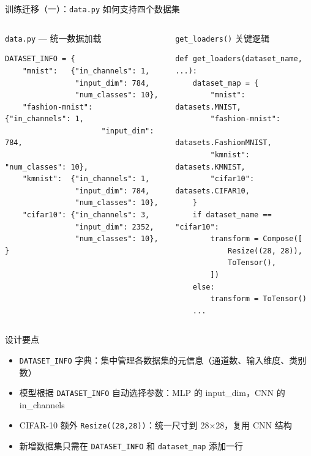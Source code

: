 \documentclass[aspectratio=169]{ctexbeamer}
\begin{document}
\begin{frame}[fragile,shrink=28]{训练迁移（一）：\texttt{data.py} 如何支持四个数据集}
\small

\begin{columns}[T]
\begin{block}{\texttt{data.py} — 统一数据加载}
\footnotesize
\begin{lstlisting}[basicstyle=\ttfamily\scriptsize, frame=none, numbers=none, backgroundcolor=\color{codebg}]
DATASET_INFO = {
    "mnist":   {"in_channels": 1,
                "input_dim": 784,
                "num_classes": 10},
    "fashion-mnist": {"in_channels": 1,
                      "input_dim": 784,
                      "num_classes": 10},
    "kmnist":  {"in_channels": 1,
                "input_dim": 784,
                "num_classes": 10},
    "cifar10": {"in_channels": 3,
                "input_dim": 2352,
                "num_classes": 10},
}
\end{lstlisting}
\end{block}

\begin{block}{\texttt{get\_loaders()} 关键逻辑}
\footnotesize
\begin{lstlisting}[basicstyle=\ttfamily\scriptsize, frame=none, numbers=none, backgroundcolor=\color{codebg}]
def get_loaders(dataset_name, ...):
    dataset_map = {
        "mnist": datasets.MNIST,
        "fashion-mnist":
            datasets.FashionMNIST,
        "kmnist": datasets.KMNIST,
        "cifar10": datasets.CIFAR10,
    }
    if dataset_name == "cifar10":
        transform = Compose([
            Resize((28, 28)),
            ToTensor(),
        ])
    else:
        transform = ToTensor()
    ...
\end{lstlisting}
\end{block}
\end{columns}

\vspace{0.1cm}

\begin{exampleblock}{设计要点}
\footnotesize
\begin{itemize}
  \item \texttt{DATASET\_INFO} 字典：集中管理各数据集的元信息（通道数、输入维度、类别数）
  \item 模型根据 \texttt{DATASET\_INFO} 自动选择参数：MLP 的 input\_dim，CNN 的 in\_channels
  \item CIFAR-10 额外 \texttt{Resize((28,28))}：统一尺寸到 28$\times$28，复用 CNN 结构
  \item 新增数据集只需在 \texttt{DATASET\_INFO} 和 \texttt{dataset\_map} 添加一行
\end{itemize}
\end{exampleblock}
\end{frame}
\end{document}
